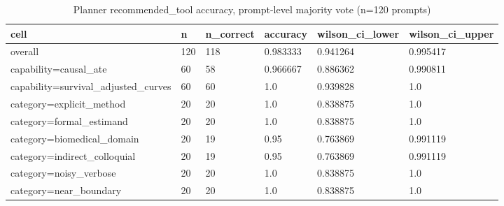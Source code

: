 \begin{table}[ht]
\centering
\caption{Planner recommended\_tool accuracy, prompt-level majority vote (n=120 prompts)}
\label{tab:planner_accuracy_majority_vote}
\begin{tabular}{llllll}
\toprule
cell & n & n\_correct & accuracy & wilson\_ci\_lower & wilson\_ci\_upper \\
\midrule
overall & 120 & 118 & 0.983333 & 0.941264 & 0.995417 \\
capability=causal\_ate & 60 & 58 & 0.966667 & 0.886362 & 0.990811 \\
capability=survival\_adjusted\_curves & 60 & 60 & 1.0 & 0.939828 & 1.0 \\
category=explicit\_method & 20 & 20 & 1.0 & 0.838875 & 1.0 \\
category=formal\_estimand & 20 & 20 & 1.0 & 0.838875 & 1.0 \\
category=biomedical\_domain & 20 & 19 & 0.95 & 0.763869 & 0.991119 \\
category=indirect\_colloquial & 20 & 19 & 0.95 & 0.763869 & 0.991119 \\
category=noisy\_verbose & 20 & 20 & 1.0 & 0.838875 & 1.0 \\
category=near\_boundary & 20 & 20 & 1.0 & 0.838875 & 1.0 \\
\bottomrule
\end{tabular}
\end{table}
